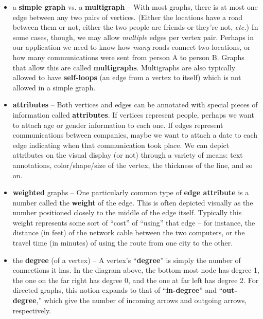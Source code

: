 \begin{itemize}

\item a \textbf{simple graph} vs. a \textbf{multigraph} -- With most graphs,
there is at most one edge between any two pairs of vertices. (Either the
locations have a road between them or not, either the two people are friends
or they're not, \textit{etc.}) In some cases, though, we may allow
\textit{multiple} edges per vertex pair. Perhaps in our application we need to
know how \textit{many} roads connect two locations, or how many communications
were sent from person A to person B. Graphs that allow this are called
\textbf{multigraphs}. Multigraphs are also typically allowed to have
\textbf{self-loops} (an edge from a vertex to itself) which is not allowed in
a simple graph.


\item \textbf{attributes} -- Both vertices and edges can be annotated with
special pieces of information called \textbf{attributes}. If vertices
represent people, perhaps we want to attach age or gender information to each
one. If edges represent communications between companies, maybe we want to
attach a date to each edge indicating when that communication took place. We
can depict attributes on the visual display (or not) through a variety of
means: text annotations, color/shape/size of the vertex, the thickness of the
line, and so on.


\item \textbf{weighted} graphs -- One particularly common type of \textbf{edge
attribute} is a number called the \textbf{weight} of the edge. This is often
depicted visually as the number positioned closely to the middle of the edge
itself. Typically this weight represents some sort of ``cost'' of ``using'' that
edge -- for instance, the distance (in feet) of the network cable between the
two computers, or the travel time (in minutes) of using the route from one
city to the other.


\item the \textbf{degree} (of a vertex) -- A vertex's ``\textbf{degree}'' is
simply the number of connections it has. In the diagram above, the bottom-most
node has degree 1, the one on the far right has degree 0, and the one at far
left has degree 2. For directed graphs, this notion expands to that of
``\textbf{in-degree}'' and ``\textbf{out-degree},'' which give the number of
incoming arrows and outgoing arrows, respectively.


\end{itemize}
